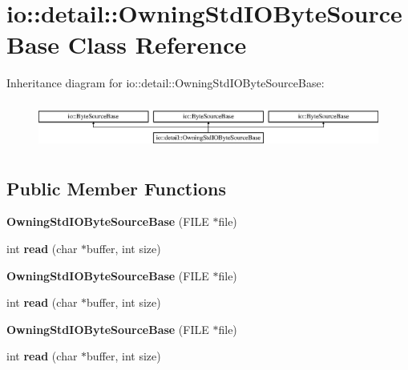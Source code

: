\hypertarget{classio_1_1detail_1_1_owning_std_i_o_byte_source_base}{}\section{io\+:\+:detail\+:\+:Owning\+Std\+I\+O\+Byte\+Source\+Base Class Reference}
\label{classio_1_1detail_1_1_owning_std_i_o_byte_source_base}
Inheritance diagram for io\+:\+:detail\+:\+:Owning\+Std\+I\+O\+Byte\+Source\+Base\+:\begin{figure}[H]
\begin{center}
\leavevmode
\includegraphics[height=1.555556cm]{db/dc4/classio_1_1detail_1_1_owning_std_i_o_byte_source_base}
\end{center}
\end{figure}
\subsection*{Public Member Functions}
\begin{DoxyCompactItemize}
\item 
\mbox{\label{classio_1_1detail_1_1_owning_std_i_o_byte_source_base_a259f77d1a3c57720b54b88d9f8a3c018}} 
{\bfseries Owning\+Std\+I\+O\+Byte\+Source\+Base} (F\+I\+LE $\ast$file)
\item 
\mbox{\label{classio_1_1detail_1_1_owning_std_i_o_byte_source_base_a9269e7bfd07ebf2fa3518912fe7bebd0}} 
int {\bfseries read} (char $\ast$buffer, int size)
\item 
\mbox{\label{classio_1_1detail_1_1_owning_std_i_o_byte_source_base_a259f77d1a3c57720b54b88d9f8a3c018}} 
{\bfseries Owning\+Std\+I\+O\+Byte\+Source\+Base} (F\+I\+LE $\ast$file)
\item 
\mbox{\label{classio_1_1detail_1_1_owning_std_i_o_byte_source_base_a9269e7bfd07ebf2fa3518912fe7bebd0}} 
int {\bfseries read} (char $\ast$buffer, int size)
\item 
\mbox{\label{classio_1_1detail_1_1_owning_std_i_o_byte_source_base_a259f77d1a3c57720b54b88d9f8a3c018}} 
{\bfseries Owning\+Std\+I\+O\+Byte\+Source\+Base} (F\+I\+LE $\ast$file)
\item 
\mbox{\label{classio_1_1detail_1_1_owning_std_i_o_byte_source_base_a9269e7bfd07ebf2fa3518912fe7bebd0}} 
int {\bfseries read} (char $\ast$buffer, int size)
\end{DoxyCompactItemize}


